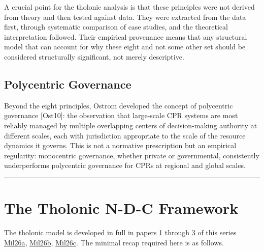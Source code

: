 \documentclass[12pt]{article}
\begin{document}
A crucial point for the tholonic analysis is that these principles were
not derived from theory and then tested against data. They were
extracted from the data first, through systematic comparison of case
studies, and the theoretical interpretation followed. Their empirical
provenance means that any structural model that can account for why
these eight and not some other set should be considered structurally
significant, not merely descriptive.

\subsection{Polycentric Governance}\label{polycentric-governance}

Beyond the eight principles, Ostrom developed the concept of polycentric
governance {[}Ost10{]}: the observation that large-scale CPR systems are
most reliably managed by multiple overlapping centers of decision-making
authority at different scales, each with jurisdiction appropriate to the
scale of the resource dynamics it governs. This is not a normative
prescription but an empirical regularity: monocentric governance,
whether private or governmental, consistently underperforms polycentric
governance for CPRs at regional and global scales.

\begin{center}\rule{0.5\linewidth}{0.5pt}\end{center}

\section{The Tholonic N-D-C Framework}\label{the-tholonic-n-d-c-framework}

The tholonic model is developed in full in papers
\href{https://github.com/baardev/truevalue/blob/main/docnav/Research/papers/1_recursive-tholonic-five-constants/1_recursive-tholonic-five-constants.pdf}{1}
through
\href{https://github.com/baardev/truevalue/blob/main/docnav/Research/papers/3_minimal-recursive-triadic-framework/3_minimal-recursive-triadic-framework.pdf}{3}
of this series
\href{https://github.com/baardev/truevalue/blob/main/docnav/Research/papers/1_recursive-tholonic-five-constants/1_recursive-tholonic-five-constants.pdf}{Mil26a},
\href{https://github.com/baardev/truevalue/blob/main/docnav/Research/papers/2_supply-chain-transparency-tvpci/2_supply-chain-transparency-tvpci.pdf}{Mil26b},
\href{https://github.com/baardev/truevalue/blob/main/docnav/Research/papers/3_minimal-recursive-triadic-framework/3_minimal-recursive-triadic-framework.pdf}{Mil26c}.
The minimal recap required here is as follows.
\end{document}
